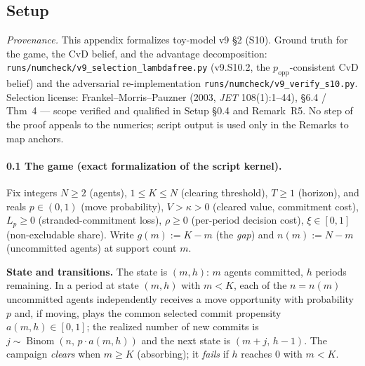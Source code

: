 
\subsection*{Setup}

\noindent\emph{Provenance.} This appendix formalizes toy-model v9 \S 2 (S10). Ground truth for the game, the CvD belief, and the advantage decomposition: \texttt{runs/numcheck/v9\_selection\_lambdafree.py} (v9.S10.2, the $p_{\mathrm{opp}}$-consistent CvD belief) and the adversarial re-implementation \texttt{runs/numcheck/v9\_verify\_s10.py}. Selection license: Frankel--Morris--Pauzner (2003, \emph{JET} 108(1):1--44), \S 6.4 / Thm~4 --- scope verified and qualified in Setup \S 0.4 and Remark~R5. No step of the proof appeals to the numerics; script output is used only in the Remarks to map anchors.

\paragraph{0.1 The game (exact formalization of the script kernel).}
Fix integers $N \ge 2$ (agents), $1 \le K \le N$ (clearing threshold), $T \ge 1$ (horizon), and reals $p \in (0,1)$ (move probability), $V > \kappa > 0$ (cleared value, commitment cost), $L_p \ge 0$ (stranded-commitment loss), $\rho \ge 0$ (per-period decision cost), $\xi \in [0,1]$ (non-excludable share). Write $g(m) := K - m$ (the \emph{gap}) and $n(m) := N - m$ (uncommitted agents) at support count $m$.

\medskip
\noindent\textbf{State and transitions.} The state is $(m,h)$: $m$ agents committed, $h$ periods remaining. In a period at state $(m,h)$ with $m < K$, each of the $n = n(m)$ uncommitted agents independently receives a move opportunity with probability $p$ and, if moving, plays the common selected commit propensity $a(m,h) \in [0,1]$; the realized number of new commits is $j \sim \operatorname{Binom}(n,\, p \cdot a(m,h))$ and the next state is $(m+j,\, h-1)$. The campaign \emph{clears} when $m \ge K$ (absorbing); it \emph{fails} if $h$ reaches $0$ with $m < K$.


